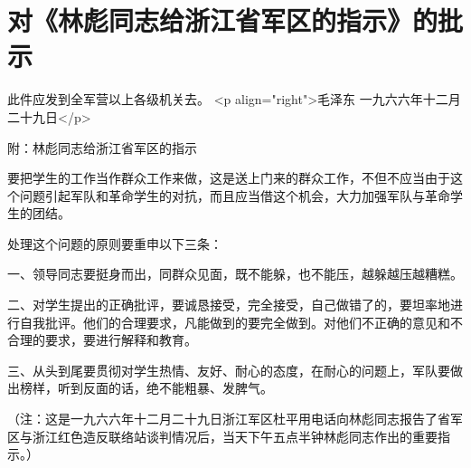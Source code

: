 \section[对《林彪同志给浙江省军区的指示》的批示（一九六六年十二月二十九日）]{对《林彪同志给浙江省军区的指示》的批示}


此件应发到全军营以上各级机关去。
<p align="right">毛泽东
一九六六年十二月二十九日</p>

附：林彪同志给浙江省军区的指示

要把学生的工作当作群众工作来做，这是送上门来的群众工作，不但不应当由于这个问题引起军队和革命学生的对抗，而且应当借这个机会，大力加强军队与革命学生的团结。

处理这个问题的原则要重申以下三条：

一、领导同志要挺身而出，同群众见面，既不能躲，也不能压，越躲越压越糟糕。

二、对学生提出的正确批评，要诚恳接受，完全接受，自己做错了的，要坦率地进行自我批评。他们的合理要求，凡能做到的要完全做到。对他们不正确的意见和不合理的要求，要进行解释和教育。

三、从头到尾要贯彻对学生热情、友好、耐心的态度，在耐心的问题上，军队要做出榜样，听到反面的话，绝不能粗暴、发脾气。

（注：这是一九六六年十二月二十九日浙江军区杜平用电话向林彪同志报告了省军区与浙江红色造反联络站谈判情况后，当天下午五点半钟林彪同志作出的重要指示。）


